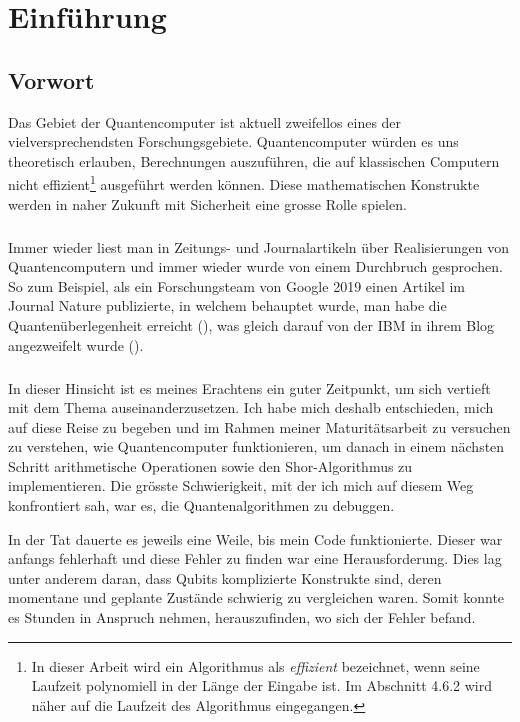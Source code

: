\chapter{Einführung}
\section{Vorwort}
Das Gebiet der Quantencomputer ist aktuell zweifellos eines der vielversprechendsten Forschungsgebiete. Quantencomputer würden es uns theoretisch erlauben, Berechnungen auszuführen, die auf klassischen Computern nicht effizient\footnote{In dieser Arbeit wird ein Algorithmus als \textit{effizient} bezeichnet, wenn seine Laufzeit polynomiell in der Länge der Eingabe ist. Im Abschnitt 4.6.2 wird näher auf die Laufzeit des Algorithmus eingegangen.} ausgeführt werden können. Diese mathematischen Konstrukte werden in naher Zukunft mit Sicherheit eine grosse Rolle spielen. 

\paragraph{}

Immer wieder liest man in Zeitungs- und Journalartikeln über Realisierungen von Quantencomputern und immer wieder wurde von einem Durchbruch gesprochen. So zum Beispiel, als ein Forschungsteam von Google 2019 einen Artikel im Journal \grqq Nature\grqq{} publizierte, in welchem behauptet wurde, man habe die \grqq Quantenüberlegenheit\grqq{} erreicht (\cite{GSP}), was gleich darauf von der IBM in ihrem Blog angezweifelt wurde (\cite{IBM}).

\paragraph{}

In dieser Hinsicht ist es meines Erachtens ein guter Zeitpunkt, um sich vertieft mit dem Thema auseinanderzusetzen. Ich habe mich deshalb entschieden, mich auf diese Reise zu begeben und im Rahmen meiner Maturitätsarbeit zu versuchen zu verstehen, wie Quantencomputer funktionieren, um danach in einem nächsten Schritt arithmetische Operationen sowie den Shor-Algorithmus zu implementieren. Die grösste Schwierigkeit, mit der ich mich auf diesem Weg konfrontiert sah, war es, die Quantenalgorithmen zu debuggen.

In der Tat dauerte es jeweils eine Weile, bis mein Code funktionierte. Dieser war anfangs fehlerhaft und diese Fehler zu finden war eine Herausforderung. Dies lag unter anderem daran, dass Qubits komplizierte Konstrukte sind, deren momentane und geplante Zustände schwierig zu vergleichen waren. Somit konnte es Stunden in Anspruch nehmen, herauszufinden, wo sich der Fehler befand.

